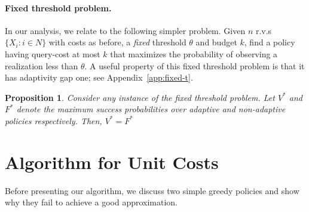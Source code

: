\documentclass[11pt]{article}
\newtheorem{prop}[thm]{Proposition}
\theoremstyle{remark}
\theoremstyle{plain}
\theoremstyle{remark}
\begin{document}
\paragraph{Fixed threshold problem.} In our analysis, we relate \smq to the following  simpler   problem. Given $n$ r.v.s $\{X_i : i\in N\}$ with costs as before, a {\em fixed} threshold $\theta$ and budget $k$, find a policy having query-cost at most $k$ that maximizes the   probability of observing a realization less than $\theta$. 
A useful property of this fixed threshold problem is that it has adaptivity gap  one;    see Appendix~\ref{app:fixed-t}. 
\begin{prop}\label{prop-fixed-t}
 Consider any instance of the fixed threshold problem.   Let  $V^*$ and $F^*$ denote the maximum success probabilities over adaptive and non-adaptive policies respectively. Then, $V^*=F^*$
\end{prop}





\section{Algorithm for Unit Costs}
\label{sec:valunit}

Before presenting our algorithm, we discuss two simple greedy policies and show why they fail to achieve a good approximation.
\end{document}
